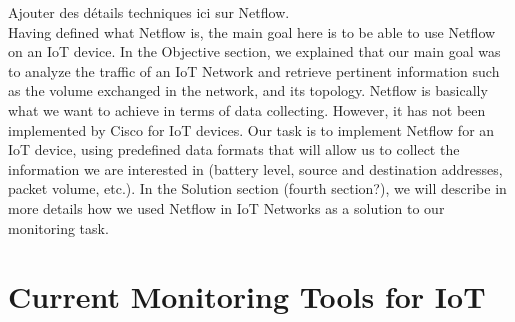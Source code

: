 Ajouter des détails techniques ici sur Netflow.\\

Having defined what Netflow is, the main goal here is to be able to use Netflow on an IoT device. In the Objective section, we explained that our main goal was to analyze the traffic of an IoT Network and retrieve pertinent information such as the volume exchanged in the network, and its topology. Netflow is basically what we want to achieve in terms of data collecting. However, it has not been implemented by Cisco for IoT devices. Our task is to implement Netflow for an IoT device, using predefined data formats that will allow us to collect the information we are interested in (battery level, source and destination addresses, packet volume, etc.). In the Solution section (fourth section?), we will describe in more details how we used Netflow in IoT Networks as a solution to our monitoring task.

\section{Current Monitoring Tools for IoT}
